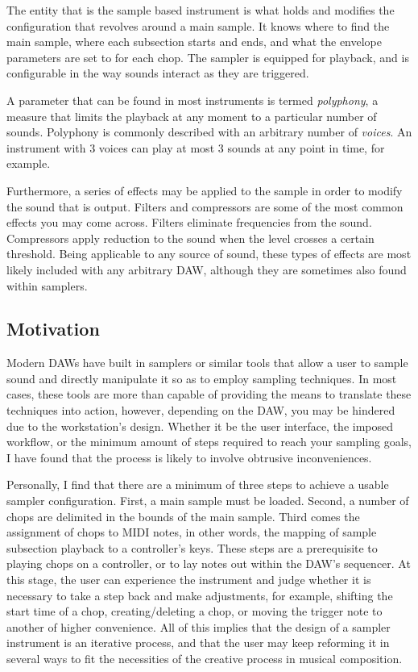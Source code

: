 \documentclass[12pt, a4paper, hidelinks]{article}
\begin{document}
 	The entity that is the sample based instrument is what holds and modifies the configuration that revolves around a main sample. It knows where to find the main sample, where each subsection starts and ends, and what the envelope parameters are set to for each chop. The sampler is equipped for playback, and is configurable in the way sounds interact as they are triggered. \par 
 	A parameter that can be found in most instruments is termed \textit{polyphony}, a measure that limits the playback at any moment to a particular number of sounds. Polyphony is commonly described with an arbitrary number of \textit{voices}. An instrument with 3 voices can play at most 3 sounds at any point in time, for example.\par
 	Furthermore, a series of effects may be applied to the sample in order to modify the sound that is output. Filters and compressors are some of the most common effects you may come across. Filters eliminate frequencies from the sound. Compressors apply reduction to the sound when the level crosses a certain threshold. Being applicable to any source of sound, these types of effects are most likely included with any arbitrary DAW, although they are sometimes also found within samplers.

	
	\newpage
	\subsection{Motivation}
	Modern DAWs have built in samplers or similar tools that allow a user to sample sound and directly manipulate it so as to employ sampling techniques. In most cases, these tools are more than capable of providing the means to translate these techniques into action, however, depending on the DAW, you may be hindered due to the workstation's design. Whether it be the user interface, the imposed workflow, or the minimum amount of steps required to reach your sampling goals, I have found that the process is likely to involve obtrusive inconveniences.\par
	 
	Personally, I find that there are a minimum of three steps to achieve a usable sampler configuration. First, a main sample must be loaded. Second, a number of chops are delimited in the bounds of the main sample. Third comes the assignment of chops to MIDI notes, in other words, the mapping of sample subsection playback to a controller's keys. These steps are a prerequisite to playing chops on a controller, or to lay notes out within the DAW's sequencer. At this stage, the user can experience the instrument and judge whether it is necessary to take a step back and make adjustments, for example, shifting the start time of a chop, creating/deleting a chop, or moving the trigger note to another of higher convenience. All of this implies that the design of a sampler instrument is an iterative process, and that the user may keep reforming it in several ways to fit the necessities of the creative process in musical composition. \par 
	
\end{document}
